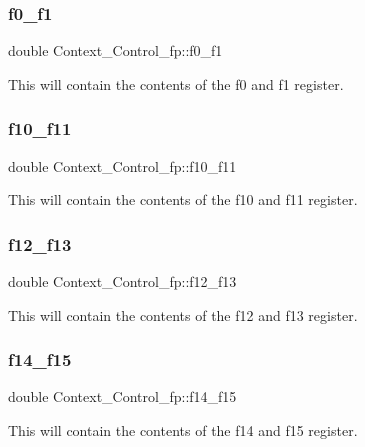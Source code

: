 \subsubsection{\texorpdfstring{f0\_f1}{f0\_f1}}
{\footnotesize\ttfamily double Context\+\_\+\+Control\+\_\+fp\+::f0\+\_\+f1}

This will contain the contents of the f0 and f1 register. \mbox{\label{structContext__Control__fp_aac5c6b6de05b1ddda41645bf54e7957e}} 
\subsubsection{\texorpdfstring{f10\_f11}{f10\_f11}}
{\footnotesize\ttfamily double Context\+\_\+\+Control\+\_\+fp\+::f10\+\_\+f11}

This will contain the contents of the f10 and f11 register. \mbox{\label{structContext__Control__fp_ae59866c9bf6bbe5714cd0a7d8b5b3a02}} 
\subsubsection{\texorpdfstring{f12\_f13}{f12\_f13}}
{\footnotesize\ttfamily double Context\+\_\+\+Control\+\_\+fp\+::f12\+\_\+f13}

This will contain the contents of the f12 and f13 register. \mbox{\label{structContext__Control__fp_aeba922b6e9a84071ee33ff60bbb6ca16}} 
\subsubsection{\texorpdfstring{f14\_f15}{f14\_f15}}
{\footnotesize\ttfamily double Context\+\_\+\+Control\+\_\+fp\+::f14\+\_\+f15}

This will contain the contents of the f14 and f15 register. \mbox{\label{structContext__Control__fp_a343eab8dcb44d65a60da6825c179c7eb}} 
